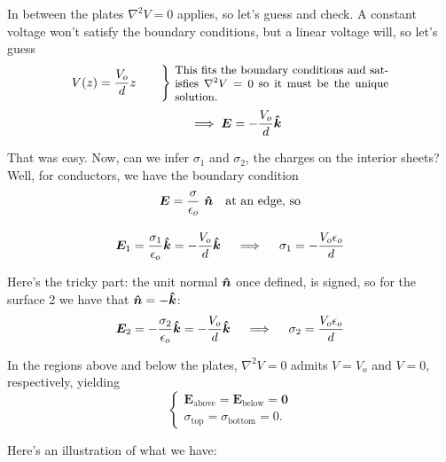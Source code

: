 \documentclass{article}
\begin{document}
In between the plates $\displaystyle \nabla^2 V = 0$ applies, so let's guess and check. A constant voltage won't satisfy the boundary conditions, but a linear voltage will, so let's guess
\begin{equation*}
	V(z) = \frac{V_o}{d} z \qquad \Bigg\} \ \parbox[c]{0.5\textwidth}{\small This fits the boundary conditions and satisfies $\nabla^2 V = 0$ so it must be the unique solution.}
\end{equation*}
\begin{equation*}
	\quad \implies \bm{E} = -\frac{V_o}{d} \bm{\hat{k}}
\end{equation*}

That was easy. Now, can we infer $\sigma_1$ and $\sigma_2$, the charges on the interior sheets? Well, for conductors, we have the boundary condition
\begin{gather*}
	\bm{E} = \frac{\sigma}{\epsilon_o}\ \bm{\hat{n}} \quad \text{at an edge, so} \\[1em]
	\bm{E}_1 = \frac{\sigma_1}{\epsilon_o} \bm{\hat{k}} = -\frac{V_o}{d} \bm{\hat{k}} \quad \implies \quad \sigma_1 = -\frac{V_o \epsilon_o}{d}
\end{gather*}

Here's the tricky part: the unit normal $\bm{\hat{n}}$ once defined, is signed, so for the surface 2 we have that $\bm{\hat{n}} = -\bm{\hat{k}}$:
\begin{equation*}
	\bm{E}_2 = -\frac{\sigma_2}{\epsilon_o} \bm{\hat{k}} = -\frac{V_o}{d} \bm{\hat{k}} \quad \implies \quad \sigma_2 = \frac{V_o \epsilon_o}{d}
\end{equation*}

In the regions above and below the plates, $\nabla^2 V = 0$ admits $V = V_o$ and $V = 0$, respectively, yielding
\begin{equation*}
	\begin{cases} \bm{E}_{\text{above}} = \bm{E}_{\text{below}} = \bm{0} \\[1em] \sigma_{\text{top}} = \sigma_{\text{bottom}} = 0. \end{cases}
\end{equation*}

Here's an illustration of what we have:
\end{document}

